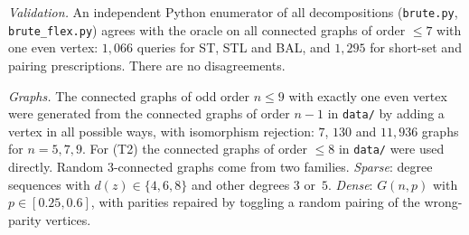 \documentclass[11pt]{amsart}
\theoremstyle{definition}
\begin{document}
\emph{Validation.} An independent Python enumerator of all decompositions (\texttt{brute.py},
\texttt{brute\_flex.py}) agrees with the oracle on all connected graphs of order $\le7$ with one
even vertex: $1{,}066$ queries for ST, STL and BAL, and $1{,}295$ for short-set and pairing
prescriptions. There are no disagreements.

\emph{Graphs.} The connected graphs of odd order $n\le9$ with exactly one even vertex were generated
from the connected graphs of order $n-1$ in \texttt{data/} by adding a vertex in all possible ways,
with isomorphism rejection: $7$, $130$ and $11{,}936$ graphs for $n=5,7,9$. For (T2) the
connected graphs of order $\le8$ in \texttt{data/} were used directly. Random $3$-connected graphs
come from two families. \emph{Sparse}: degree sequences with $d(z)\in\{4,6,8\}$ and other degrees
$3$ or~$5$. \emph{Dense}: $G(n,p)$ with $p\in[0.25,0.6]$, with parities repaired by toggling a
random pairing of the wrong-parity vertices.
\end{document}
